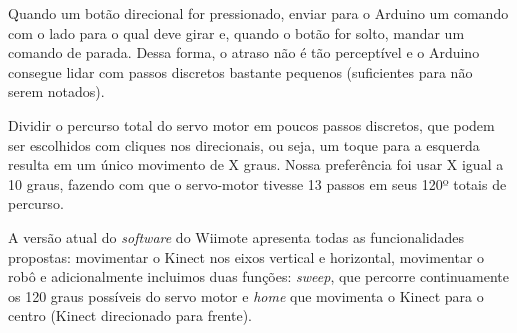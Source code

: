 \begin{compactitem}
\begin{compactitem}
\item Quando um botão direcional for pressionado, enviar para o Arduino um comando com o lado para o qual deve girar e, quando o botão for solto, mandar um comando de parada. Dessa forma, o atraso não é tão perceptível e o Arduino consegue lidar com passos discretos bastante pequenos (suficientes para não serem notados).
\item Dividir o percurso total do servo motor em poucos passos discretos, que podem ser escolhidos com cliques nos direcionais, ou seja, um toque para a esquerda resulta em um único movimento de X graus. Nossa preferência foi usar X igual a 10 graus, fazendo com que o servo-motor tivesse 13 passos em seus 120º totais de percurso.
\end{compactitem} 
\end{compactitem}

A versão atual do \textit{software} do Wiimote apresenta todas as funcionalidades propostas: movimentar o Kinect nos eixos vertical e horizontal, movimentar o robô e adicionalmente incluimos duas funções: \textit{sweep}, que percorre continuamente os 120 graus possíveis do servo motor e \textit{home} que movimenta o Kinect para o centro (Kinect direcionado para frente).